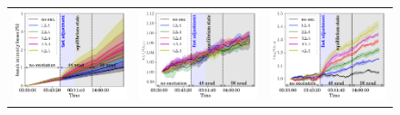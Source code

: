 \documentclass[%
 reprint,
 amsmath,amssymb,
 aps,
prstab,
longbibliography
]{revtex4-1}
\newlength{\thirdwidth}
\begin{document}
\begin{figure}
  \begin{tabular}{ccc}
    \includegraphics[width=\thirdwidth]{2016_bunch_intensity_v10th_no_damper_avg.png}&
    \includegraphics[width=\thirdwidth]{2016_emith_avg_rel_v10th_no_damper.png}&
    \includegraphics[width=\thirdwidth]{2016_emitv_avg_rel_v10th_no_damper.png}\\

\end{tabular}
\end{figure}
\end{document}
